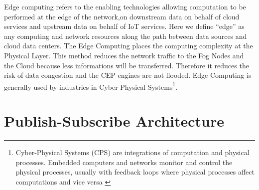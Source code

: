 \documentclass[11pt]{article}
\begin{document}
Edge computing refers to the enabling technologies allowing computation to be performed at the edge of the network,on downstream data on behalf of cloud services and upstream data on behalf of IoT services. Here we define “edge” as any computing and network resources along the path between data sources and cloud data centers.\cite{Edge Computing - Vision and Challenges}
\newline\newline
The Edge Computing places the computing complexity at the Physical Layer. This method reduces the network traffic to the Fog Nodes and the Cloud because less informations will be transferred. Therefore it reduces the risk of data congestion and the CEP engines are not flooded. Edge Computing is generally used by industries in Cyber Physical Systems\footnote{Cyber-Physical Systems (CPS) are integrations of computation and physical processes. Embedded computers and networks monitor and control the physical processes, usually with feedback loops where physical processes affect computations and vice versa \cite{5}}.


\section{Publish-Subscribe Architecture}
\end{document}
